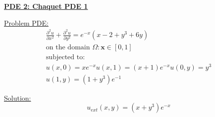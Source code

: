 \documentclass[.\jobname.tex]{subfiles}
\begin{document}
\begin{figure}[H]
	\centering
	\noindent{}
	\label{fig:sol_plot_1}
\end{figure}



\newpage


\underline{\textbf{PDE 2: Chaquet PDE 1}}

\underline{Problem PDE:} 
\begin{equation}
\label{eq:pde2}
\begin{split}
\frac{\partial^2 u}{\partial x^2} + \frac{\partial^2 u}{\partial y^2} = e^{-x} (x-2 + y^3 + 6y) \\
\text{on the domain } \Omega: \mathbf{x} \in [0,1] \\
\text{subjected to: } \\
u(x,0) = xe^{-x}
u(x,1) = (x + 1)e^{-x}
u(0,y) = y^3 \\
u(1,y) = (1 + y^3) e^{-1}
\end{split}
\end{equation}


\underline{Solution:}
\begin{equation}
\label{eq:sol2}
u_{ext}(x,y) = (x + y^3) e^{-x}
\end{equation}



\begin{figure}[H]
	\centering
	\noindent{}
	\label{fig:sol_plot_2}
\end{figure}
\end{document}
